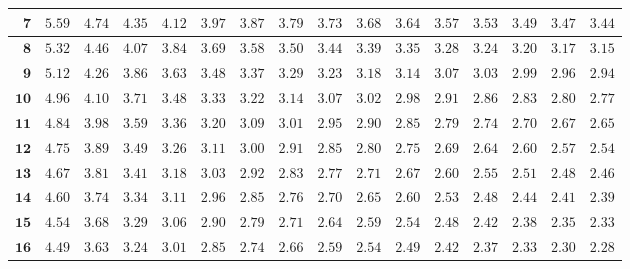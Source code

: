 \begin{customTableWrapper}{1.4}
\begin{longtable}{|r|r|r|r|r|r|r|r|r|r|r|r|r|r|r|r|}
    ${\mathbf{7}}$  & ${5.59}$   & ${4.74}$   & ${4.35}$   & ${4.12}$   & ${3.97}$   & ${3.87}$   & ${3.79}$   & ${3.73}$   & ${3.68}$   & ${3.64}$   & ${3.57}$   & ${3.53}$   & ${3.49}$   & ${3.47}$   & ${3.44}$   \\ \hline
    ${\mathbf{8}}$  & ${5.32}$   & ${4.46}$   & ${4.07}$   & ${3.84}$   & ${3.69}$   & ${3.58}$   & ${3.50}$   & ${3.44}$   & ${3.39}$   & ${3.35}$   & ${3.28}$   & ${3.24}$   & ${3.20}$   & ${3.17}$   & ${3.15}$   \\ \hline
    ${\mathbf{9}}$  & ${5.12}$   & ${4.26}$   & ${3.86}$   & ${3.63}$   & ${3.48}$   & ${3.37}$   & ${3.29}$   & ${3.23}$   & ${3.18}$   & ${3.14}$   & ${3.07}$   & ${3.03}$   & ${2.99}$   & ${2.96}$   & ${2.94}$   \\ \hline
    ${\mathbf{10}}$  & ${4.96}$   & ${4.10}$   & ${3.71}$   & ${3.48}$   & ${3.33}$   & ${3.22}$   & ${3.14}$   & ${3.07}$   & ${3.02}$   & ${2.98}$   & ${2.91}$   & ${2.86}$   & ${2.83}$   & ${2.80}$   & ${2.77}$   \\ \hline
    ${\mathbf{11}}$  & ${4.84}$   & ${3.98}$   & ${3.59}$   & ${3.36}$   & ${3.20}$   & ${3.09}$   & ${3.01}$   & ${2.95}$   & ${2.90}$   & ${2.85}$   & ${2.79}$   & ${2.74}$   & ${2.70}$   & ${2.67}$   & ${2.65}$   \\ \hline
    ${\mathbf{12}}$  & ${4.75}$   & ${3.89}$   & ${3.49}$   & ${3.26}$   & ${3.11}$   & ${3.00}$   & ${2.91}$   & ${2.85}$   & ${2.80}$   & ${2.75}$   & ${2.69}$   & ${2.64}$   & ${2.60}$   & ${2.57}$   & ${2.54}$   \\ \hline
    ${\mathbf{13}}$  & ${4.67}$   & ${3.81}$   & ${3.41}$   & ${3.18}$   & ${3.03}$   & ${2.92}$   & ${2.83}$   & ${2.77}$   & ${2.71}$   & ${2.67}$   & ${2.60}$   & ${2.55}$   & ${2.51}$   & ${2.48}$   & ${2.46}$   \\ \hline
    ${\mathbf{14}}$  & ${4.60}$   & ${3.74}$   & ${3.34}$   & ${3.11}$   & ${2.96}$   & ${2.85}$   & ${2.76}$   & ${2.70}$   & ${2.65}$   & ${2.60}$   & ${2.53}$   & ${2.48}$   & ${2.44}$   & ${2.41}$   & ${2.39}$   \\ \hline
    ${\mathbf{15}}$  & ${4.54}$   & ${3.68}$   & ${3.29}$   & ${3.06}$   & ${2.90}$   & ${2.79}$   & ${2.71}$   & ${2.64}$   & ${2.59}$   & ${2.54}$   & ${2.48}$   & ${2.42}$   & ${2.38}$   & ${2.35}$   & ${2.33}$   \\ \hline
    ${\mathbf{16}}$  & ${4.49}$   & ${3.63}$   & ${3.24}$   & ${3.01}$   & ${2.85}$   & ${2.74}$   & ${2.66}$   & ${2.59}$   & ${2.54}$   & ${2.49}$   & ${2.42}$   & ${2.37}$   & ${2.33}$   & ${2.30}$   & ${2.28}$   \\ \hline

\end{longtable}
\end{customTableWrapper}
